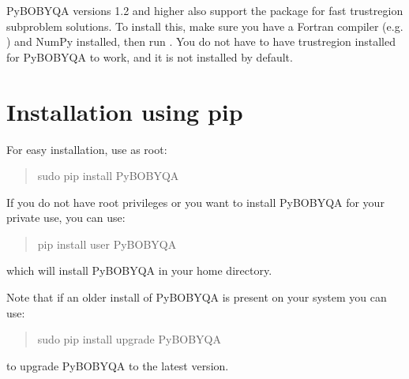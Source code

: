 \documentclass[letterpaper,10pt,english]{sphinxmanual}
\begin{document}
 Py\sphinxhyphen{}BOBYQA versions 1.2 and higher also support the  package for fast trust\sphinxhyphen{}region subproblem solutions. To install this, make sure you have a Fortran compiler (e.g. ) and NumPy installed, then run . You do not have to have trustregion installed for Py\sphinxhyphen{}BOBYQA to work, and it is not installed by default.


\section{Installation using pip}
\label{\detokenize{install:installation-using-pip}}
For easy installation, use  as root:
\begin{quote}

\begin{sphinxVerbatim}[commandchars=\\\{\}]
\PYGZdl{} \PYG{o}{[}sudo\PYG{o}{]} pip install Py\PYGZhy{}BOBYQA
\end{sphinxVerbatim}
\end{quote}

If you do not have root privileges or you want to install Py\sphinxhyphen{}BOBYQA for your private use, you can use:
\begin{quote}

\begin{sphinxVerbatim}[commandchars=\\\{\}]
\PYGZdl{} pip install \PYGZhy{}\PYGZhy{}user Py\PYGZhy{}BOBYQA
\end{sphinxVerbatim}
\end{quote}

which will install Py\sphinxhyphen{}BOBYQA in your home directory.

Note that if an older install of Py\sphinxhyphen{}BOBYQA is present on your system you can use:
\begin{quote}

\begin{sphinxVerbatim}[commandchars=\\\{\}]
\PYGZdl{} \PYG{o}{[}sudo\PYG{o}{]} pip install \PYGZhy{}\PYGZhy{}upgrade Py\PYGZhy{}BOBYQA
\end{sphinxVerbatim}
\end{quote}

to upgrade Py\sphinxhyphen{}BOBYQA to the latest version.
\end{document}
